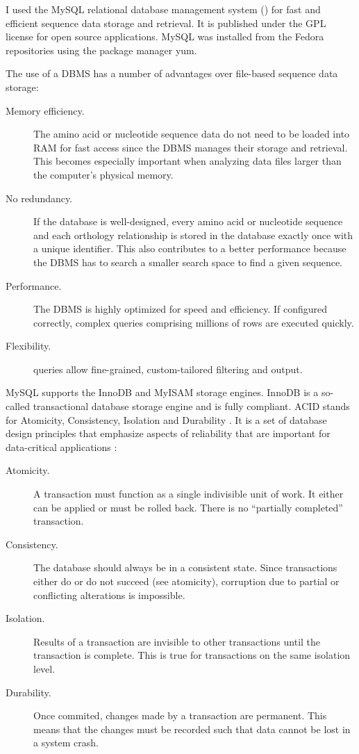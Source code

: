 \label{sec:mysql}
I used the MySQL relational database management system
() 
for fast and efficient sequence data storage and retrieval. It is published
under the GPL license for open source applications. MySQL was installed from the
Fedora repositories using the package manager yum.

The use of a DBMS has a number of advantages over file-based sequence data
storage:

\begin{description}
	\item[Memory efficiency.] The amino acid or nucleotide sequence data do not
		need to be loaded into RAM for fast access since the DBMS manages their
		storage and retrieval.  This becomes especially important when analyzing data
		files larger than the computer's physical memory.
	\item[No redundancy.] If the database is well-designed, every amino acid or
		nucleotide sequence and each orthology relationship is stored in the database
		exactly once with a unique identifier. This also contributes to a better
		performance because the DBMS has to search a smaller search space to find a
		given sequence.
	\item[Performance.] The DBMS is highly optimized for speed and efficiency. If
		configured correctly, complex queries comprising millions of rows are
		executed quickly.
	\item[Flexibility.]  queries
		allow fine-grained, custom-tailored filtering and output.
\end{description}

MySQL supports the InnoDB \citep{mysql2013} and MyISAM \citep{mysql2013} storage
engines. InnoDB is a so-called transactional database storage engine and is
fully 
compliant. ACID stands for Atomicity, Consistency, Isolation and Durability
\citep{haerder1983}. It is a set of database design principles that emphasize
aspects of reliability that are important for data-critical applications
\citep{schwartz2012}:

\begin{description}
	\item[Atomicity.] A transaction must function as a single indivisible unit of
		work. It either can be applied or must be rolled back. There is no
		``partially completed'' transaction.
	\item[Consistency.] The database should always be in a consistent state. Since
		transactions either do or do not succeed (see atomicity), corruption due to
		partial or conflicting alterations is impossible.
	\item[Isolation.] Results of a transaction are invisible to other
		transactions until the transaction is complete. This is true for
		transactions on the same isolation level.
	\item[Durability.] Once commited, changes made by a transaction are permanent.
		This means that the changes must be recorded such that data cannot be lost
		in a system crash. 
\end{description}

